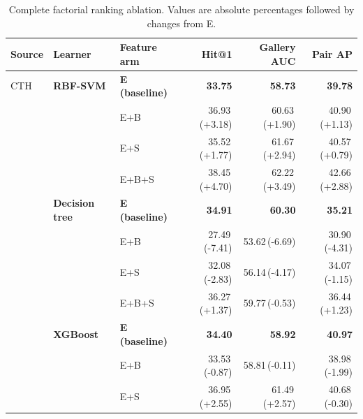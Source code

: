 \begin{table}[!htbp]
\centering
\scriptsize
\setlength{\tabcolsep}{3pt}
\renewcommand{\arraystretch}{1.07}
\caption{Complete factorial ranking ablation. Values are absolute percentages followed by changes from E.}
\label{tab:full-ranking-ablation}
\begin{tabularx}{\linewidth}{@{}p{.82in}p{1.15in}Yrrr@{}}
\toprule Source & Learner & Feature arm & Hit@1 & Gallery AUC & Pair AP \\
\midrule
CTH & \textbf{RBF-SVM} & \textbf{E (baseline)} & \textbf{33.75} & \textbf{58.73} & \textbf{39.78} \\
 &  & \quad E+B & 36.93{\scriptsize\,(+3.18)} & 60.63{\scriptsize\,(+1.90)} & 40.90{\scriptsize\,(+1.13)} \\
 &  & \quad E+S & 35.52{\scriptsize\,(+1.77)} & 61.67{\scriptsize\,(+2.94)} & 40.57{\scriptsize\,(+0.79)} \\
 &  & \quad E+B+S & 38.45{\scriptsize\,(+4.70)} & 62.22{\scriptsize\,(+3.49)} & 42.66{\scriptsize\,(+2.88)} \\
\addlinespace[.12em]
 & \textbf{Decision tree} & \textbf{E (baseline)} & \textbf{34.91} & \textbf{60.30} & \textbf{35.21} \\
 &  & \quad E+B & 27.49{\scriptsize\,(-7.41)} & 53.62{\scriptsize\,(-6.69)} & 30.90{\scriptsize\,(-4.31)} \\
 &  & \quad E+S & 32.08{\scriptsize\,(-2.83)} & 56.14{\scriptsize\,(-4.17)} & 34.07{\scriptsize\,(-1.15)} \\
 &  & \quad E+B+S & 36.27{\scriptsize\,(+1.37)} & 59.77{\scriptsize\,(-0.53)} & 36.44{\scriptsize\,(+1.23)} \\
\addlinespace[.12em]
 & \textbf{XGBoost} & \textbf{E (baseline)} & \textbf{34.40} & \textbf{58.92} & \textbf{40.97} \\
 &  & \quad E+B & 33.53{\scriptsize\,(-0.87)} & 58.81{\scriptsize\,(-0.11)} & 38.98{\scriptsize\,(-1.99)} \\
 &  & \quad E+S & 36.95{\scriptsize\,(+2.55)} & 61.49{\scriptsize\,(+2.57)} & 40.68{\scriptsize\,(-0.30)} \\

\end{tabularx}
\end{table}
